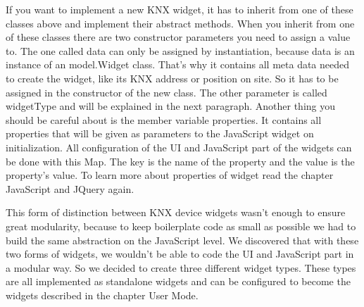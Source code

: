     If you want to implement a new KNX widget, it has to inherit from one of these classes above and implement their abstract methods. When you inherit from one of these classes there are two constructor parameters you need to assign a value to. The one called data can only be assigned by instantiation, because data is an instance of an model.Widget class. That's why it contains all meta data needed to create the widget, like its KNX address or position on site. So it has to be assigned in the constructor of the new class. The other parameter is called widgetType and will be explained in the next paragraph. Another thing you should be careful about is the member variable properties. It contains all properties that will be given as parameters to the JavaScript widget on initialization. All configuration of the UI and JavaScript part of the widgets can be done with this Map. The key is the name of the property and the value is the property's value. To learn more about properties of widget read the chapter JavaScript and JQuery again.

    This form of distinction between KNX device widgets wasn't enough to ensure great modularity, because to keep boilerplate code as small as possible we had to build the same abstraction on the JavaScript level. We discovered that with these two forms of widgets, we wouldn't be able to code the UI and JavaScript part in a modular way. So we decided to create three different widget types. These types are all implemented as standalone widgets and can be configured to become the widgets described in the chapter User Mode.

